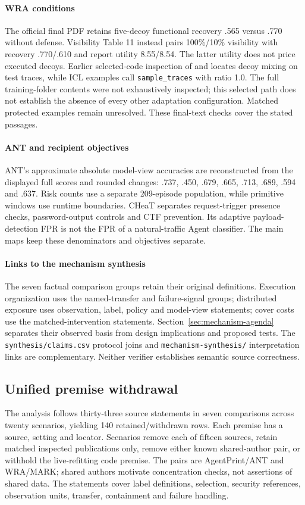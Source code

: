 \paragraph{WRA conditions} The official final PDF retains five-decoy functional recovery .565 versus .770 without defense. Visibility Table 11 instead pairs 100\%/10\% visibility with recovery .770/.610 and report utility 8.55/8.54. The latter utility does not price executed decoys. Earlier selected-code inspection of  and  locates decoy mixing on test traces, while ICL examples call \texttt{sample\_traces} with ratio 1.0. The full training-folder contents were not exhaustively inspected; this selected path does not establish the absence of every other adaptation configuration. Matched protected examples remain unresolved. These final-text checks cover the stated passages.

\paragraph{ANT and recipient objectives} ANT's approximate absolute model-view accuracies are reconstructed from the displayed full scores and rounded changes: .737, .450, .679, .665, .713, .689, .594 and .637. Risk counts use a separate 209-episode population, while primitive windows use runtime boundaries. CHeaT separates request-trigger presence checks, password-output controls and CTF prevention. Its adaptive payload-detection FPR is not the FPR of a natural-traffic Agent classifier. The main maps keep these denominators and objectives separate.

\paragraph{Links to the mechanism synthesis} The seven factual comparison groups retain their original definitions. Execution organization uses the named-transfer and failure-signal groups; distributed exposure uses observation, label, policy and model-view statements; cover costs use the matched-intervention statements. Section~\ref{sec:mechanism-agenda} separates their observed basis from design implications and proposed tests. The \texttt{synthesis/claims.csv} protocol joins and \texttt{mechanism-synthesis/} interpretation links are complementary. Neither verifier establishes semantic source correctness.

\subsection{Unified premise withdrawal}\label{supp:conclusion-withdrawal}
The analysis follows thirty-three source statements in seven comparisons across twenty scenarios, yielding 140 retained/withdrawn rows. Each premise has a source, setting and locator. Scenarios remove each of fifteen sources, retain matched inspected publications only, remove either known shared-author pair, or withhold the live-refitting code premise. The pairs are AgentPrint/ANT and WRA/MARK; shared authors motivate concentration checks, not assertions of shared data. The statements cover label definitions, selection, security references, observation units, transfer, containment and failure handling.

